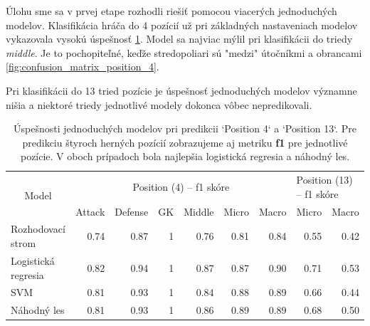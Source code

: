 \documentclass[runningheads]{llncs}
\begin{document}
Úlohu sme sa v prvej etape rozhodli riešiť pomocou viacerých jednoduchých modelov. Klasifikácia hráča do 4 pozícií už pri základných nastaveniach modelov vykazovala vysokú úspešnosť \ref{tab:f1_position_4}. Model sa najviac mýlil pri klasifikácii do triedy \textit{middle}. Je to pochopiteľné, keďže stredopoliari sú "medzi" útočníkmi a obrancami \ref{fig:confusion_matrix_position_4}. 

Pri klasifikácii do 13 tried pozície je úspešnosť jednoduchých modelov významne nišia a niektoré triedy jednotlivé modely dokonca vôbec nepredikovali.

\begin{table}[]
    \begin{tabular}{|l|rrrrrr|rr}
    \hline
    \multicolumn{1}{|c|}{\multirow{2}{*}{Model}} & \multicolumn{6}{c|}{Position (4) -- f1 skóre}                               & \multicolumn{2}{l|}{Position (13) -- f1 skóre} \\
    \multicolumn{1}{|c|}{}                       & Attack & Defense & GK         & Middle & Micro & \multicolumn{1}{l|}{Macro} & Micro       & \multicolumn{1}{l|}{Macro}       \\ \hline
    Rozhodovací strom                            & 0.74   & 0.87    & 1          & 0.76   & 0.81  & 0.84                       & 0.55        & \multicolumn{1}{r|}{0.42}        \\
    Logistická regresia                          & 0.82   & 0.94    & 1          & 0.87   & 0.87  & 0.90                       & 0.71        & \multicolumn{1}{r|}{0.53}        \\
    SVM                                          & 0.81   & 0.93    & 1          & 0.84   & 0.88  & 0.89                       & 0.66        & \multicolumn{1}{r|}{0.44}        \\
    Náhodný les                                  & 0.81   & 0.93    & 1          & 0.86   & 0.89  & 0.89                       & 0.68        & \multicolumn{1}{r|}{0.50}        \\ \hline
    \end{tabular}
    \\
    \caption{\label{tab:f1_position_4} Úspešnosti jednoduchých modelov pri predikcii `Position 4` a `Position 13`. Pre predikciu štyroch herných pozícií zobrazujeme aj metriku \textbf{f1} pre jednotlivé pozície. V oboch prípadoch bola najlepšia logistická regresia a náhodný les.}
\end{table}
\end{document}
